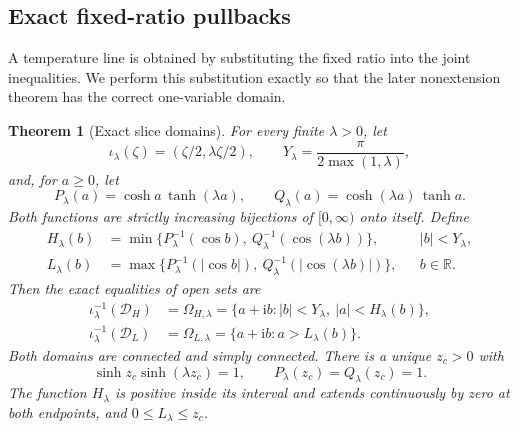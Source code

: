 \documentclass[11pt]{article}
\numberwithin{equation}{section}
\newtheorem{theorem}{Theorem}[section]
\theoremstyle{definition}
\newcommand{\R}{\mathbb R}
\newcommand{\ii}{\mathrm i}
\renewcommand{\DH}{\mathcal D_H}
\newcommand{\DL}{\mathcal D_L}
\begin{document}
\subsection{Exact fixed-ratio pullbacks}
\label{geo:slices-section}

A temperature line is obtained by substituting the fixed ratio into
the joint inequalities. We perform this substitution exactly so that
the later nonextension theorem has the correct one-variable domain.

\begin{theorem}[Exact slice domains]\label{geo:exact-pullbacks}
For every finite \(\lambda>0\), let
\[
 \iota_\lambda(\zeta)=(\zeta/2,\lambda\zeta/2),\qquad
 Y_\lambda=\frac{\pi}{2\max(1,\lambda)},
\]
and, for \(a\geq0\), let
\[
 P_\lambda(a)=\cosh a\,\tanh(\lambda a),\qquad
 Q_\lambda(a)=\cosh(\lambda a)\,\tanh a.
\]
Both functions are strictly increasing bijections of
\([0,\infty)\) onto itself.  Define
\begin{align*}
 H_\lambda(b)&=\min\{
  P_\lambda^{-1}(\cos b),\
  Q_\lambda^{-1}(\cos(\lambda b))\},
       &&|b|<Y_\lambda,\\
 L_\lambda(b)&=\max\{
  P_\lambda^{-1}(|\cos b|),\
  Q_\lambda^{-1}(|\cos(\lambda b)|)\},
       &&b\in\R.
\end{align*}
Then the exact equalities of open sets are
\begin{align}
 \iota_\lambda^{-1}(\DH)
 &=\Omega_{H,\lambda}
   =\{a+\ii b:|b|<Y_\lambda,\ |a|<H_\lambda(b)\},
                         \label{geo:HT-pullback}\\
 \iota_\lambda^{-1}(\DL)
 &=\Omega_{L,\lambda}
   =\{a+\ii b:a>L_\lambda(b)\}.
                         \label{geo:LT-pullback}
\end{align}
Both domains are connected and simply connected.
There is a unique \(z_c>0\) with
\[
 \sinh z_c\sinh(\lambda z_c)=1,\qquad
 P_\lambda(z_c)=Q_\lambda(z_c)=1.
\]
The function \(H_\lambda\) is positive inside its interval
and extends continuously by zero at both endpoints,
and \(0\leq L_\lambda\leq z_c\).
\end{theorem}
\end{document}
